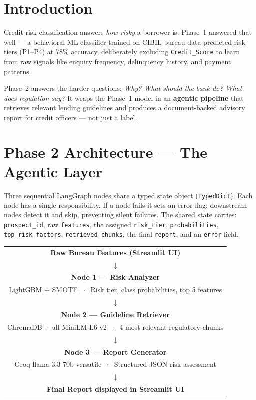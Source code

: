 \documentclass[11pt,a4paper]{article}
\begin{document}
\section{Introduction}

Credit risk classification answers \textit{how risky} a borrower is. Phase~1 answered that well --- a behavioral ML classifier trained on CIBIL bureau data predicted risk tiers (P1--P4) at 78\% accuracy, deliberately excluding \texttt{Credit\_Score} to learn from raw signals like enquiry frequency, delinquency history, and payment patterns.

Phase~2 answers the harder questions: \textit{Why? What should the bank do? What does regulation say?} It wraps the Phase~1 model in an \textbf{agentic pipeline} that retrieves relevant lending guidelines and produces a document-backed advisory report for credit officers --- not just a label.

\section{Phase 2 Architecture --- The Agentic Layer}

Three sequential LangGraph nodes share a typed state object (\texttt{TypedDict}). Each node has a single responsibility. If a node fails it sets an error flag; downstream nodes detect it and skip, preventing silent failures. The shared state carries: \texttt{prospect\_id}, raw \texttt{features}, the assigned \texttt{risk\_tier}, \texttt{probabilities}, \texttt{top\_risk\_factors}, \texttt{retrieved\_chunks}, the final \texttt{report}, and an \texttt{error} field.

\vspace{4pt}
\begin{tcolorbox}[archbox, title={LangGraph Workflow --- End-to-End Flow}]
\small
\begin{center}
\begin{tabular}{c}
    \textbf{Raw Bureau Features (Streamlit UI)}\\[0.5em]
    $\downarrow$\\[0.5em]
    \textbf{Node 1 --- Risk Analyzer}\\[0.15em]
    LightGBM + SMOTE $\;\cdot\;$ Risk tier, class probabilities, top 5 features\\[0.5em]
    $\downarrow$\\[0.5em]
    \textbf{Node 2 --- Guideline Retriever}\\[0.15em]
    ChromaDB + all-MiniLM-L6-v2 $\;\cdot\;$ 4 most relevant regulatory chunks\\[0.5em]
    $\downarrow$\\[0.5em]
    \textbf{Node 3 --- Report Generator}\\[0.15em]
    Groq llama-3.3-70b-versatile $\;\cdot\;$ Structured JSON risk assessment\\[0.5em]
    $\downarrow$\\[0.5em]
    \textbf{Final Report displayed in Streamlit UI}
\end{tabular}
\end{center}
\end{tcolorbox}
\end{document}
